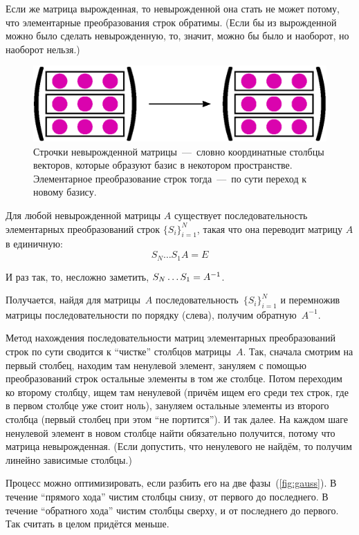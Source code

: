 \documentclass[a4paper,12pt]{article}
\begin{document}
    Если же матрица вырожденная, то невырожденной она стать не может потому, что элементарные преобразования строк обратимы.
    (Если бы из вырожденной можно было сделать невырожденную, то, значит, можно бы было и наоборот, но наоборот нельзя.)
    
    \begin{figure}[h]
      \centering
    
      \includegraphics[width=0.5\columnwidth]{elem-square}
    
      \caption{Строчки невырожденной матрицы~---~словно координатные столбцы векторов, которые образуют базис в некотором пространстве. Элементарное преобразование строк тогда~---~по сути переход к новому базису.}
      \label{fig:elem-square}
    \end{figure}
    
    \begin{theorem}
      Для любой невырожденной матрицы $A$ существует последовательность элементарных преобразований строк $\{S_i\}_{i = 1}^N$, такая что она переводит матрицу $A$ в единичную:
      \[
        S_N \ldots S_1 A = E
      \]
      
      И раз так, то, несложно заметить, $S_N \ldots S_1 \hm= A^{-1}$.
    \end{theorem}
    
    Получается, найдя для матрицы~$A$ последовательность~$\{S_i\}_{i = 1}^N$ и перемножив матрицы последовательности по порядку (слева), получим обратную~$A^{-1}$.
    
    Метод нахождения последовательности матриц элементарных преобразований строк по сути сводится к ``чистке'' столбцов матрицы~$A$.
    Так, сначала смотрим на первый столбец, находим там ненулевой элемент, зануляем с помощью преобразований строк остальные элементы в том же столбце.
    Потом переходим ко второму столбцу, ищем там ненулевой (причём ищем его среди тех строк, где в первом столбце уже стоит ноль), зануляем остальные элементы из второго столбца (первый столбец при этом ``не портится'').
    И так далее.
    На каждом шаге ненулевой элемент в новом столбце найти обязательно получится, потому что матрица невырожденная.
    (Если допустить, что ненулевого не найдём, то получим линейно зависимые столбцы.)
    
    Процесс можно оптимизировать, если разбить его на две фазы~(\ref{fig:gauss}).
    В течение ``прямого хода'' чистим столбцы снизу, от первого до последнего.
    В течение ``обратного хода'' чистим столбцы сверху, и от последнего до первого.
    Так считать в целом придётся меньше.
    
\end{document}
